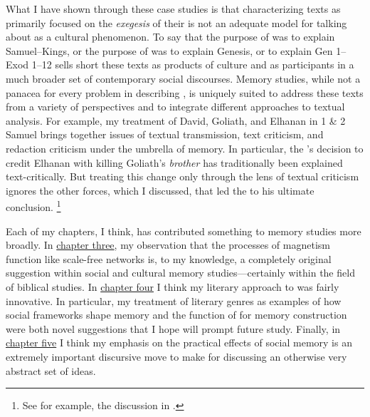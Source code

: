 What I have shown through these case studies is that characterizing \rwb texts as primarily focused on the \emph{exegesis} of their \vorlagen is not an adequate model for talking about \rwb as a cultural phenomenon. To say that the purpose of \chronicles was to explain Samuel--Kings, or the purpose of \ga was to explain Genesis, or \jub to explain Gen 1--Exod 1--12 sells short these texts as products of culture and as participants in a much broader set of contemporary social discourses. Memory studies, while not a panacea for every problem in describing \rwb, is uniquely suited to address these texts from a variety of perspectives and to integrate different approaches to textual analysis. For example, my treatment of David, Goliath, and Elhanan in 1 \& 2 Samuel brings together issues of textual transmission, text criticism, and redaction criticism under the umbrella of memory. In particular, the \chronicler's decision to credit Elhanan with killing Goliath's \emph{brother} has traditionally been explained text-critically. But treating this change only through the lens of textual criticism ignores the other forces, which I discussed, that led the \chronicler to his ultimate conclusion.%
    \footnote{See for example, the discussion in \cite[368--369]{japhet1993}.}

Each of my chapters, I think, has contributed something to memory studies more broadly. In \hyperref[chap:chronicles]{chapter three}, my observation that the processes of magnetism function like scale-free networks is, to my knowledge, a completely original suggestion within social and cultural memory studies---certainly within the field of biblical studies. In \hyperref[chap:ga]{chapter four} I think my literary approach to \ga was fairly innovative. In particular, my treatment of literary genres as examples of how social frameworks shape memory and the function of \psy for memory construction were both novel suggestions that I hope will prompt future study. Finally, in \hyperref[chap:jubilees]{chapter five} I think my emphasis on the practical effects of social memory is an extremely important discursive move to make for discussing an otherwise very abstract set of ideas. 

